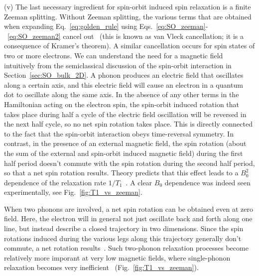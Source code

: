 \documentclass[rmp,twocolumn,aps]{revtex4}
\begin{document}
(v) The last necessary ingredient for spin-orbit induced spin
relaxation is a finite Zeeman splitting. Without Zeeman splitting,
the various terms that are obtained when expanding Eq.~\ref{eq:golden_rule} using Eqs.~\ref{eq:SO_zeeman}-~\ref{eq:SO_zeeman2} cancel out~\cite{khaetskii01} (this is known as van Vleck cancellation; it is a consequence of Kramer's theorem). A similar cancellation occurs
for spin states of two or more electrons. We can understand the need for a magnetic field intuitively from the semiclassical discussion of the spin-orbit interaction in Section~\ref{sec:SO_bulk_2D}. A phonon produces an electric field that oscillates along a certain axis, and this electric field will cause an electron in a quantum dot to
oscillate along the same axis. In the absence of any other terms
in the Hamiltonian acting on the electron spin, the spin-orbit
induced rotation that takes place during half a cycle of the 
electric field oscillation will be reversed in the next half cycle, so no net spin rotation takes place. This is
directly connected to the fact that the spin-orbit interaction
obeys time-reversal symmetry. In contrast, in the presence of an
external magnetic field, the spin rotation (about the sum of the
external and spin-orbit induced magnetic field) during the first
half period doesn't commute with the spin rotation during the
second half period, so that a net spin rotation results. 
Theory predicts that this effect leads to a $B_0^2$ dependence of the relaxation rate $1/T_1$~\cite{khaetskii01,bulaev05,golovach07}. A clear $B_0$ dependence was indeed seen experimentally, see Fig.~\ref{fig:T1_vs_zeeman}.

When two phonons are involved, a net spin rotation can be obtained even at zero field. Here, the electron will in general not just oscillate back and forth along one line, but instead describe a closed trajectory in two dimensions. Since the spin rotations induced during the various legs along this trajectory generally don't commute, a net rotation results~\cite{sanjose06}.
Such two-phonon relaxation processes become relatively more imporant at very low magnetic fields, where single-phonon relaxation becomes very inefficient~\cite{khaetskii01,sanjose06} (Fig.~\ref{fig:T1_vs_zeeman}).
\end{document}
